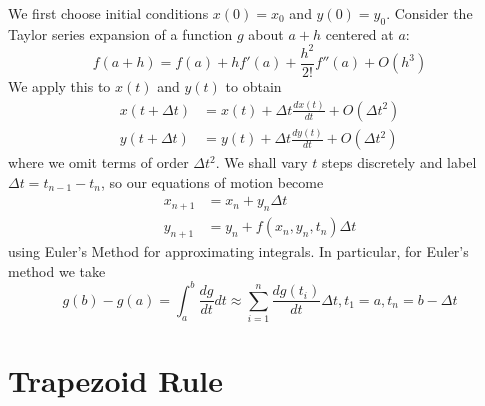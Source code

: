 \documentclass[12pt, a4paper, oneside, openright, titlepage]{book}
\begin{document}
\begin{proc}
        We first choose initial conditions $x(0) = x_0$ and $y(0) = y_0$. Consider the Taylor series expansion of a function $g$ about $a+h$ centered at $a$:\begin{equation}
                f(a+h) = f(a) + hf'(a) + \frac{h^2}{2!}f''(a) + O(h^3)
        \end{equation}
        We apply this to $x(t)$ and $y(t)$ to obtain \begin{align}
                x(t + \Delta t) &= x(t) + \Delta t \frac{dx(t)}{dt} + O(\Delta t^2)\\
                y(t + \Delta t) &= y(t) + \Delta t \frac{dy(t)}{dt} + O(\Delta t^2)
        \end{align}
        where we omit terms of order $\Delta t^2$. We shall vary $t$ steps discretely and label $\Delta t = t_{n-1} - t_n$, so our equations of motion become \begin{align}
                x_{n+1} &= x_n + y_n\Delta t \\
                y_{n+1} &= y_n + f(x_n,y_n,t_n)\Delta t
        \end{align}
        using Euler's Method for approximating integrals. In particular, for Euler's method we take \begin{equation}
                g(b) - g(a) = \int_a^b\frac{dg}{dt}dt \approx \sum_{i=1}^n\frac{dg(t_i)}{dt}\Delta t, t_1 = a, t_n = b - \Delta t
        \end{equation}
\end{proc}


\section{Trapezoid Rule}
\end{document}
